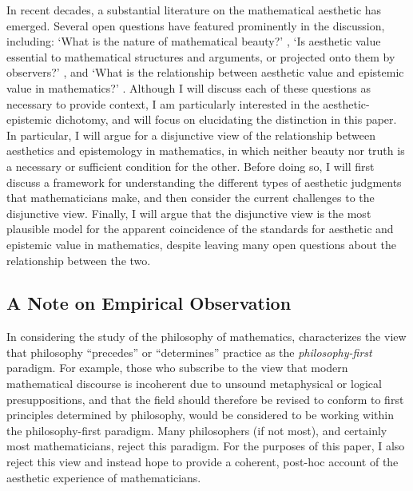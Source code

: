 \documentclass[a4paper,man,natbib]{apa6}
\begin{document}
In recent decades, a substantial literature on the mathematical aesthetic has emerged. Several open questions have
featured prominently in the discussion, including: `What is the nature of mathematical beauty?' 
\citep{blasjo_definition_2012,cellucci_mathematical_2015}, `Is aesthetic value essential to mathematical structures
and arguments, or projected onto them by observers?' \citep{mcallister_mathematical_2005}, and `What is the relationship
between aesthetic value and epistemic value in mathematics?' \citep{todd_unmasking_2008,todd_fitting_2018}. Although
I will discuss each of these questions as necessary to provide context, I am particularly interested in the 
aesthetic-epistemic dichotomy, and will focus on elucidating the distinction in this paper. In particular, I will argue for a
disjunctive view of the relationship between aesthetics and epistemology in mathematics, in which neither beauty
nor truth is a necessary or sufficient condition for the other. Before doing so, I will first discuss a framework
for understanding the different types of aesthetic judgments that mathematicians make, and then consider the current
challenges to the disjunctive view. Finally, I will argue that the disjunctive view is the most plausible model
for the apparent coincidence of the standards for aesthetic and epistemic value in mathematics, despite leaving
many open questions about the relationship between the two.

\subsection{A Note on Empirical Observation}

In considering the study of the philosophy of mathematics, \cite{shapiro_thinking_2000} characterizes
the view that philosophy ``precedes'' or ``determines'' practice as the \textit{philosophy-first} paradigm.
For example, those who subscribe to the view that modern mathematical discourse is incoherent due to unsound
metaphysical or logical presuppositions, and that the field should therefore be revised to conform to
first principles determined by philosophy, would be considered to be working within the philosophy-first
paradigm. Many philosophers (if not most), and certainly most mathematicians, reject this paradigm. For the
purposes of this paper, I also reject this view and instead hope to provide a coherent, post-hoc account
of the aesthetic experience of mathematicians. 
\end{document}
